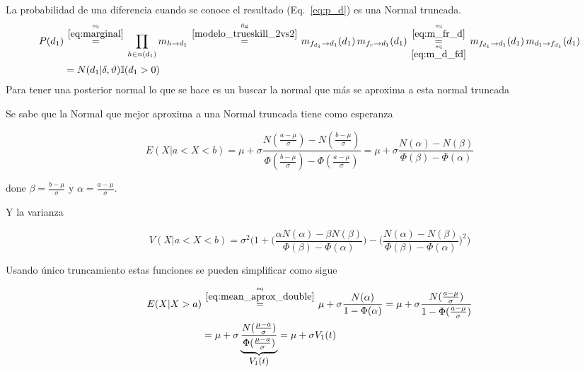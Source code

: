 \documentclass[article]{jss}
\newcommand\hfrac[2]{\genfrac{}{}{0pt}{}{#1}{#2}} %
\begin{document}
\begin{appendix}
La probabilidad de una diferencia cuando se conoce el resultado (Eq.~\ref{eq:p_d}) es una Normal truncada.
%
\begin{equation}\label{eq:p_d}
\begin{split}
 P(d_1) & \overset{\hfrac{\text{eq}}{\ref{eq:marginal}}}{=}   \prod_{h \in n(d_1)} m_{h \rightarrow d_1} \overset{\hfrac{\text{fig}}{\ref{modelo_trueskill_2vs2}}}{=} m_{f_{d_1} \rightarrow d_1}(d_1) \, m_{f_r \rightarrow d_1}(d_1) \overset{\hfrac{\text{eq}}{\ref{eq:m_fr_d}}}{\underset{\hfrac{\text{eq}}{\ref{eq:m_d_fd}}}{=}}  m_{f_{d_1} \rightarrow d_1}(d_1) \, m_{d_1 \rightarrow f_{d_1}}(d_1)  \\
 & = N(d_1|\delta,\vartheta) \mathbb{I}(d_1 > 0)
\end{split}
\end{equation}
%
Para tener una posterior normal lo que se hace es un buscar la normal que m\'as se aproxima a esta normal truncada

\vspace{0.3cm}

Se sabe que la Normal que mejor aproxima a una Normal truncada tiene como esperanza

\begin{equation}\label{eq:mean_aprox_double}
 E(X| a < X < b) = \mu + \sigma \frac{N(\frac{a-\mu}{\sigma}) - N(\frac{b-\mu}{\sigma}) }{\Phi(\frac{b-\mu}{\sigma}) - \Phi(\frac{a-\mu}{\sigma}) } = \mu + \sigma \frac{N(\alpha) - N(\beta) }{\Phi(\beta) - \Phi(\alpha) }
\end{equation}

done $\beta = \frac{b-\mu}{\sigma}$ y $\alpha = \frac{a-\mu}{\sigma}$.

Y la varianza 

\begin{equation}\label{eq:variance_aprox_double}
 V(X| a < X < b) = \sigma^2 \Bigg( 1 + \bigg(\frac{\alpha N(\alpha) - \beta N(\beta) }{\Phi(\beta) - \Phi(\alpha) }\bigg) - \bigg(\frac{N(\alpha) - N(\beta) }{\Phi(\beta) - \Phi(\alpha) }\bigg)^2 \Bigg)
\end{equation}

Usando  \'unico truncamiento estas funciones se pueden simplificar como sigue

\begin{equation}\label{eq:mean_aprox_}
\begin{split}
 E(X|  X > a)  & \overset{\hfrac{\text{eq}}{\ref{eq:mean_aprox_double}}}{=}  \mu + \sigma \frac{N(\alpha)}{1 - \Phi(\alpha) } = \mu + \sigma \frac{N(\frac{a-\mu}{\sigma})}{1 - \Phi(\frac{a-\mu}{\sigma}) }\\
 & = \mu + \sigma \underbrace{\frac{N(\frac{\mu-a}{\sigma})}{\Phi(\frac{\mu-a}{\sigma}) }}_{\text{\small $V_1(t)$} } = \mu + \sigma V_1(t)
 \end{split}
\end{equation}


\end{appendix}
\end{document}
